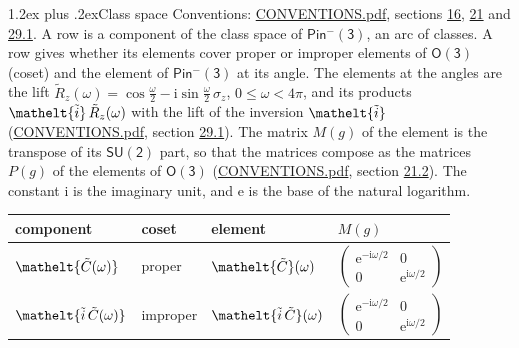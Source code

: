 \documentclass[10pt,a4paper]{article}
\makeatletter
\renewcommand\section{\@startsection{section}{1}{\z@}{-3ex plus -1ex minus -.2ex}%
  {1.2ex plus .2ex}{\normalfont\large\sffamily\bfseries\color{parttitle}}}
\numberwithin{equation}{section}
\newcommand{\eltfont}[1]{{\let\sigma\eltsigma\mathelt{#1}}}
\newcommand{\grp}[1]{\mathsf{#1}}
\newcommand{\comp}[1]{\eltfont{#1}}
\newcommand{\elt}[1]{\eltfont{#1}}
\newcommand{\iunit}{\mathrm{i}}
\newcommand{\expe}{\mathrm{e}}
\newcommand{\lift}[1]{\tilde{#1}}
\newcommand{\pauli}[1]{\sigma_{#1}}
\makeatother
\begin{document}
\section{Class space}\label{s:class_space}
Conventions: \href{../../CONVENTIONS.pdf}{CONVENTIONS.pdf}, sections \href{../../../rotation/CONVENTIONS.pdf\#conv.16}{16}, \href{../../CONVENTIONS.pdf\#conv.21}{21} and \href{../../CONVENTIONS.pdf\#conv.29.1}{29.1}.
\leavevmode\label{n:head.component}A row is a component of the class space of $\grp{Pin^{-}(3)}$, an arc of classes. \label{n:head.coset}\label{n:head.element}A row gives whether its elements cover proper or improper elements of \href{../../../rotation/data/pdf/O3.pdf}{$\grp{O(3)}$} (coset) and the element of $\grp{Pin^{-}(3)}$ at its angle. \label{n:angle.omega}The elements at the angles are the lift $\lift{R}_z(\omega) = \cos\tfrac{\omega}{2} - \iunit\sin\tfrac{\omega}{2}\,\pauli{z}$, $0 \le \omega < 4\pi$, and its products $\elt{\lift{i}}\,\lift{R}_z(\omega)$ with the lift of the inversion $\elt{\lift{i}}$ (\href{../../CONVENTIONS.pdf}{CONVENTIONS.pdf}, section \href{../../CONVENTIONS.pdf\#conv.29.1}{29.1}). \label{n:matrix.element.pin}The matrix $M(g)$ of the element is the transpose of its $\grp{SU(2)}$ part, so that the matrices compose as the matrices $P(g)$ of the elements of \href{../../../rotation/data/pdf/O3.pdf}{$\grp{O(3)}$} (\href{../../CONVENTIONS.pdf}{CONVENTIONS.pdf}, section \href{../../CONVENTIONS.pdf\#conv.21.2}{21.2}).
The constant $\iunit$ is the imaginary unit, and $\expe$ is the base of the natural logarithm.
\begin{center}\begin{tabular}{@{}llll@{}}\toprule
component & coset & element & $M(g)$\\\midrule
$\comp{\lift{C}(\omega)}$ & proper & $\elt{\lift{C}}(\omega)$ & $\left(\begin{smallmatrix}\expe^{-\iunit\omega/2} & 0\\ 0 & \expe^{\iunit\omega/2}\end{smallmatrix}\right)$\\\addlinespace[6pt]
$\comp{\lift{i}\,\lift{C}(\omega)}$ & improper & $\elt{\lift{i}\,\lift{C}}(\omega)$ & $\left(\begin{smallmatrix}\expe^{-\iunit\omega/2} & 0\\ 0 & \expe^{\iunit\omega/2}\end{smallmatrix}\right)$\\
\bottomrule\end{tabular}\end{center}
\end{document}
